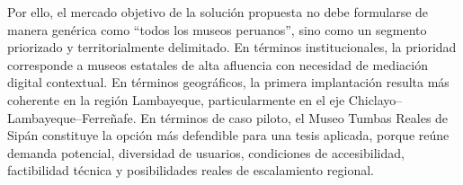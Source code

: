 Por ello, el mercado objetivo de la solución propuesta no debe formularse de manera genérica como ``todos los museos peruanos'', sino como un segmento priorizado y territorialmente delimitado. En términos institucionales, la prioridad corresponde a museos estatales de alta afluencia con necesidad de mediación digital contextual. En términos geográficos, la primera implantación resulta más coherente en la región Lambayeque, particularmente en el eje Chiclayo--Lambayeque--Ferreñafe. En términos de caso piloto, el Museo Tumbas Reales de Sipán constituye la opción más defendible para una tesis aplicada, porque reúne demanda potencial, diversidad de usuarios, condiciones de accesibilidad, factibilidad técnica y posibilidades reales de escalamiento regional.

